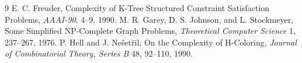 \documentclass[11pt]{article}
\begin{document}
\begin{thebibliography}{9}
E. C. Freuder, Complexity of K-Tree Structured Constraint Satisfaction
Problems, \emph{AAAI-90}, 4--9, 1990.
M. R. Garey, D. S. Johnson, and L. Stockmeyer, Some Simplified
NP-Complete Graph Problems, \emph{Theoretical Computer Science} 1,
237--267, 1976.
P. Hell and J. Ne\v{s}et\v{r}il, On the Complexity of H-Coloring,
\emph{Journal of Combinatorial Theory, Series B} 48, 92--110, 1990.
\end{thebibliography}
\end{document}
